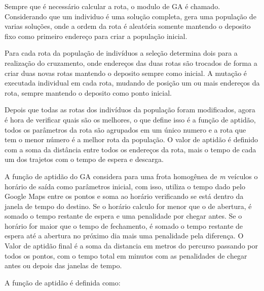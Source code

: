Sempre que é necessário calcular a rota, o modulo de GA é chamado. Considerando que um individuo é uma solução completa, gera uma população de varias soluções, onde a ordem da rota é aleatória somente mantendo o deposito fixo como primeiro endereço para criar a população inicial.

Para cada rota da população de indivíduos a seleção determina dois para a realização do cruzamento, onde endereços das duas rotas são trocados de forma a criar duas novas rotas mantendo o deposito sempre como inicial. A mutação é executada individual em cada rota, mudando de posição um ou mais endereços da rota, sempre mantendo o deposito como ponto inicial.

Depois que todas as rotas dos indivíduos da população foram modificados, agora é hora de verificar quais são os melhores, o que define isso é a função de aptidão, todos os parâmetros da rota são agrupados em um único numero e a rota que tem o menor número é a melhor rota da população. O valor de aptidão é definido com a soma da distância entre todos os endereços da rota, mais o tempo de cada um dos trajetos com o tempo de espera e descarga.

A função de aptidão do GA considera para uma frota homogênea de \textit{m} veículos o horário de saída como parâmetros inicial, com isso, utiliza o tempo dado pelo Google Maps entre os pontos e soma ao horário verificando se está dentro da janela de tempo do destino. Se o horário calculo for menor que o de abertura, é somado o tempo restante de espera e uma penalidade por chegar antes. Se o horário for maior que o tempo de fechamento, é somado o tempo restante de espera até a abertura no próximo dia mais uma penalidade pela diferença. O Valor de aptidão final é a soma da distancia em metros do percurso passando por todos os pontos, com o tempo total em minutos com as penalidades de chegar antes ou depois das janelas de tempo.

A função de aptidão é definida como:

\begin{center}
	\label{fig:MetodoAptidao}
\end{center}

